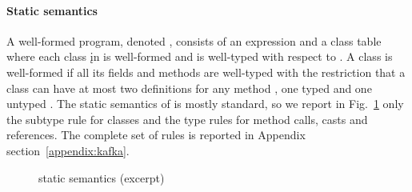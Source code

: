 \documentclass[acmlarge, anonymous, authordraft]{acmart}
\begin{document}
\paragraph{Static semantics}

 A well-formed program, denoted \WFp\e\K, consists of an expression \e and a
class table \K where each class \k in \K is well-formed and \e is well-typed
with respect to \K.  A class is well-formed if all its fields and methods
are well-typed with the restriction that a class can have at most two
definitions for any method \m, one typed \Mdef\m\x\C\D\e and one untyped
\Mdef\m\x\any\any\e.  The static semantics of \kafka is mostly standard,
so we report in Fig.~\ref{f:staticsem} only the subtype rule for classes and the type rules for method calls, casts and references.
The complete
set of rules is reported in Appendix section~\ref{appendix:kafka}.  


\begin{figure}[!t]
\hrulefill

{\small
\begin{mathpar}








\end{mathpar}}
\hrulefill
\caption{\kafka static semantics (excerpt)}\label{f:staticsem}
\end{figure}
\end{document}
